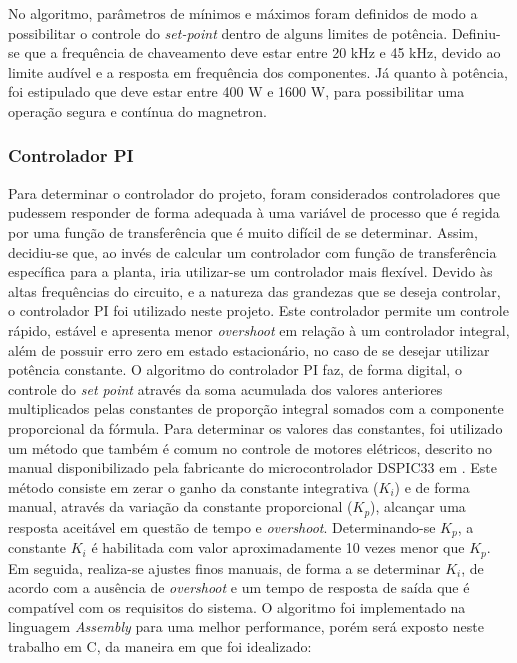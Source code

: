 No algoritmo, parâmetros de mínimos e máximos foram definidos de modo a possibilitar o controle do \textit{set-point} dentro de alguns limites de potência. Definiu-se que a frequência de chaveamento deve estar entre 20 kHz e 45 kHz, devido ao limite audível e a resposta em frequência dos componentes. Já quanto à potência, foi estipulado que deve estar entre 400 W e 1600 W, para possibilitar uma operação segura e contínua do magnetron.

\subsubsection{Controlador PI}
Para determinar o controlador do projeto, foram considerados controladores que pudessem responder de forma adequada à uma variável de processo que é regida por uma função de transferência que é muito difícil de se determinar. Assim, decidiu-se que, ao invés de calcular um controlador com função de transferência específica para a planta, iria utilizar-se um controlador mais flexível. Devido às altas frequências do circuito, e a natureza das grandezas que se deseja controlar, o controlador PI foi utilizado neste projeto. Este controlador permite um controle rápido, estável e apresenta menor \textit{overshoot} em relação à um controlador integral, além de possuir erro zero em estado estacionário, no caso de se desejar utilizar potência constante. O algoritmo do controlador PI faz, de forma digital, o controle do \textit{set point} através da soma acumulada dos valores anteriores multiplicados pelas constantes de proporção integral somados com a componente proporcional da fórmula. Para determinar os valores das constantes, foi utilizado um método que também é comum no controle de motores elétricos, descrito no manual disponibilizado pela fabricante do microcontrolador DSPIC33 em . Este método consiste em zerar o ganho da constante integrativa ($K_i$) e de forma manual, através da variação da constante proporcional ($K_p$), alcançar uma resposta aceitável em questão de tempo e \textit{overshoot}. Determinando-se $K_p$, a constante $K_i$ é habilitada com valor aproximadamente 10 vezes menor que $K_p$. Em seguida, realiza-se ajustes finos manuais, de forma a se determinar $K_i$, de acordo com a ausência de \textit{overshoot} e um tempo de resposta de saída que é compatível com os requisitos do sistema. O algoritmo foi implementado na linguagem \textit{Assembly} para uma melhor performance, porém será exposto neste trabalho em C, da maneira em que foi idealizado:

